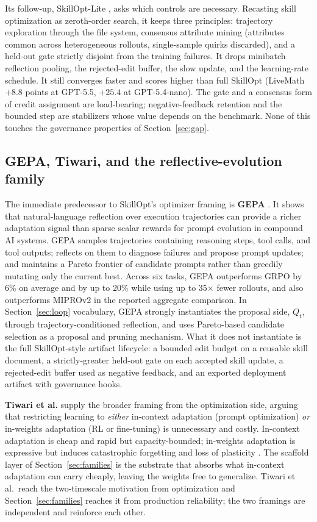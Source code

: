 \documentclass[
  11pt,
]{article}
\begin{document}
Its follow-up, SkillOpt-Lite \cite{shen2026skilloptlite}, asks which controls are necessary. Recasting skill optimization as zeroth-order search, it keeps three principles: trajectory exploration through the file system, consensus attribute mining (attributes common across heterogeneous rollouts, single-sample quirks discarded), and a held-out gate strictly disjoint from the training failures. It drops minibatch reflection pooling, the rejected-edit buffer, the slow update, and the learning-rate schedule. It still converges faster and scores higher than full SkillOpt (LiveMath \(+8.8\) points at GPT-5.5, \(+25.4\) at GPT-5.4-nano). The gate and a consensus form of credit assignment are load-bearing; negative-feedback retention and the bounded step are stabilizers whose value depends on the benchmark. None of this touches the governance properties of Section~\ref{sec:gap}.

\subsection{GEPA, Tiwari, and the reflective-evolution family}\label{app:families-4}

The immediate predecessor to SkillOpt's optimizer framing is \textbf{GEPA} \cite{agrawal2025gepa}. It shows that natural-language reflection over execution trajectories can provide a richer adaptation signal than sparse scalar rewards for prompt evolution in compound AI systems. GEPA samples trajectories containing reasoning steps, tool calls, and tool outputs; reflects on them to diagnose failures and propose prompt updates; and maintains a Pareto frontier of candidate prompts rather than greedily mutating only the current best. Across six tasks, GEPA outperforms GRPO by 6\% on average and by up to 20\% while using up to 35× fewer rollouts, and also outperforms MIPROv2 in the reported aggregate comparison. In Section~\ref{sec:loop} vocabulary, GEPA strongly instantiates the proposal side, \(Q_t\), through trajectory-conditioned reflection, and uses Pareto-based candidate selection as a proposal and pruning mechanism. What it does not instantiate is the full SkillOpt-style artifact lifecycle: a bounded edit budget on a reusable skill document, a strictly-greater held-out gate on each accepted skill update, a rejected-edit buffer used as negative feedback, and an exported deployment artifact with governance hooks.

\textbf{Tiwari et al.} \cite{tiwari2026fastandslow} supply the broader framing from the optimization side, arguing that restricting learning to \emph{either} in-context adaptation (prompt optimization) \emph{or} in-weights adaptation (RL or fine-tuning) is unnecessary and costly. In-context adaptation is cheap and rapid but capacity-bounded; in-weights adaptation is expressive but induces catastrophic forgetting and loss of plasticity \cite{dohare2024loss}. The scaffold layer of Section~\ref{sec:families} is the substrate that absorbs what in-context adaptation can carry cheaply, leaving the weights free to generalize. Tiwari et al.~reach the two-timescale motivation from optimization and Section~\ref{sec:families} reaches it from production reliability; the two framings are independent and reinforce each other.
\end{document}
